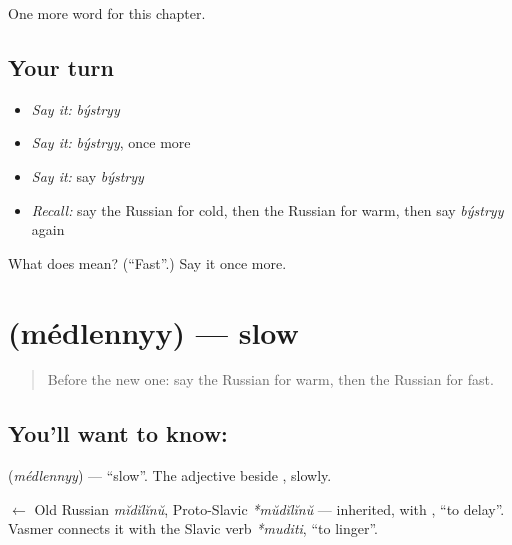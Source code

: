 \begin{grammarlens}[title={What you've built}]
One more word for this chapter.
\end{grammarlens}

\subsection*{Your turn}
\begin{itemize}
\raggedright
  \item \emph{Say it:} \emph{býstryy}
  \item \emph{Say it:} \emph{býstryy}, once more
  \item \emph{Say it:} say \emph{býstryy}
  \item \emph{Recall:} say the Russian for cold, then the Russian for warm, then say \emph{býstryy} again
\end{itemize}

\begin{tcolorbox}[breakable,colback=teal!4,colframe=teal!35!black,title={Before you move on}]
What does  mean? (\textquotedblleft{}Fast\textquotedblright{}.) Say it once more.
\end{tcolorbox}
\section[\texorpdfstring{\ru{медленный} (médlennyy)}{медленный (médlennyy)}]{ (médlennyy) — slow}

\label{lesson:RU-C66-slow}



\begin{quote}
Before the new one: say the Russian for warm, then the Russian for fast.
\end{quote}

\subsection*{You'll want to know: }
\textbf{} (\emph{médlennyy}) — \textquotedblleft{}slow\textquotedblright{}. The adjective beside \textbf{}, slowly.

\begin{cousinweb}
\textbf{} $\leftarrow$ Old Russian \emph{mĭdĭlĭnŭ}, Proto-Slavic \emph{*mŭdĭlĭnŭ} — inherited, with \emph{}, \textquotedblleft{}to delay\textquotedblright{}. Vasmer connects it with the Slavic verb \emph{*muditi}, \textquotedblleft{}to linger\textquotedblright{}.
\end{cousinweb}

